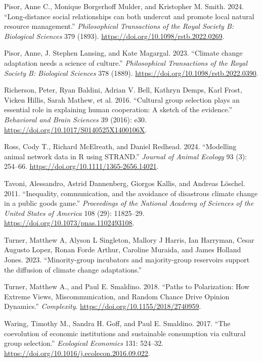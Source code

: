 \documentclass[
]{article}
\newlength{\cslhangindent}
\newenvironment{CSLReferences}[2] %
 {\begin{list}{}{%
  \setlength{\itemindent}{0pt}
  \setlength{\leftmargin}{0pt}
  \setlength{\parsep}{0pt}
  \ifodd #1
   \setlength{\leftmargin}{\cslhangindent}
   \setlength{\itemindent}{-1\cslhangindent}
  \fi
  \setlength{\itemsep}{#2\baselineskip}}}
 {\end{list}}
\begin{document}
\begin{CSLReferences}{1}{0}
Pisor, Anne C., Monique Borgerhoff Mulder, and Kristopher M. Smith.
2024. {``{Long-distance social relationships can both undercut and
promote local natural resource management}.''} \emph{Philosophical
Transactions of the Royal Society B: Biological Sciences} 379 (1893).
\url{https://doi.org/10.1098/rstb.2022.0269}.

Pisor, Anne, J. Stephen Lansing, and Kate Magargal. 2023. {``{Climate
change adaptation needs a science of culture}.''} \emph{Philosophical
Transactions of the Royal Society B: Biological Sciences} 378 (1889).
\url{https://doi.org/10.1098/rstb.2022.0390}.

Richerson, Peter, Ryan Baldini, Adrian V. Bell, Kathryn Demps, Karl
Frost, Vicken Hillis, Sarah Mathew, et al. 2016. {``{Cultural group
selection plays an essential role in explaining human cooperation: A
sketch of the evidence}.''} \emph{Behavioral and Brain Sciences} 39
(2016): e30. \url{https://doi.org/10.1017/S0140525X1400106X}.

Ross, Cody T., Richard McElreath, and Daniel Redhead. 2024.
{``{Modelling animal network data in R using STRAND}.''} \emph{Journal
of Animal Ecology} 93 (3): 254--66.
\url{https://doi.org/10.1111/1365-2656.14021}.

Tavoni, Alessandro, Astrid Dannenberg, Giorgos Kallis, and Andreas
Löschel. 2011. {``{Inequality, communication, and the avoidance of
disastrous climate change in a public goods game}.''} \emph{Proceedings
of the National Academy of Sciences of the United States of America} 108
(29): 11825--29. \url{https://doi.org/10.1073/pnas.1102493108}.

Turner, Matthew A, Alyson L Singleton, Mallory J Harris, Ian Harryman,
Cesar Augusto Lopez, Ronan Forde Arthur, Caroline Muraida, and James
Holland Jones. 2023. {``{Minority-group incubators and majority-group
reservoirs support the diffusion of climate change adaptations}.''}

Turner, Matthew A., and Paul E. Smaldino. 2018. {``{Paths to
Polarization: How Extreme Views, Miscommunication, and Random Chance
Drive Opinion Dynamics}.''} \emph{Complexity}.
\url{https://doi.org/10.1155/2018/2740959}.

Waring, Timothy M., Sandra H. Goff, and Paul E. Smaldino. 2017. {``{The
coevolution of economic institutions and sustainable consumption via
cultural group selection}.''} \emph{Ecological Economics} 131: 524--32.
\url{https://doi.org/10.1016/j.ecolecon.2016.09.022}.


\end{CSLReferences}
\end{document}
